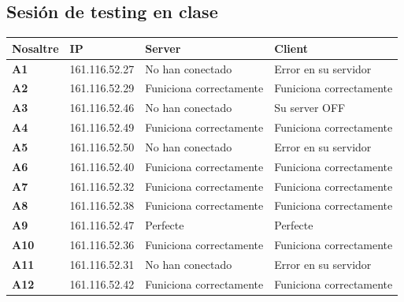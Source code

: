 \newpage
\subsection*{Sesión de testing en clase}
\begin{center}
    \begin{tabular}{| l || l | l | l |}
    \hline
    \textbf{Nosaltre} & \textbf{IP} & \textbf{Server} & \textbf{Client} \\ \hline
    \textbf{A1} & 161.116.52.27 & No han conectado  & Error en su servidor \\ \hline
	\textbf{A2} & 161.116.52.29 &  Funiciona correctamente & Funiciona correctamente\\ \hline
	\textbf{A3}	& 161.116.52.46 & No han conectado   & Su server OFF\\
	\textbf{A4}	& 161.116.52.49 & Funiciona correctamente  & Funiciona correctamente\\ \hline
	\textbf{A5}	& 161.116.52.50 & No han conectado   & Error en su servidor\\ \hline
	\textbf{A6}	& 161.116.52.40 & Funiciona correctamente  & Funiciona correctamente\\ \hline
	\textbf{A7}	& 161.116.52.32 & Funiciona correctamente  & Funiciona correctamente\\ \hline
	\textbf{A8}	& 161.116.52.38 & Funiciona correctamente  & Funiciona correctamente\\ \hline
	\textbf{A9}	& 161.116.52.47 & Perfecte  & Perfecte\\ \hline
	\textbf{A10}	 & 161.116.52.36 &  Funiciona correctamente & Funiciona correctamente\\ \hline
	\textbf{A11}	 & 161.116.52.31 & No han conectado   & Error en su servidor\\ \hline
	\textbf{A12}	 & 161.116.52.42 & Funiciona correctamente  & Funiciona correctamente\\ \hline
    \end{tabular}
\end{center}


\newpage
